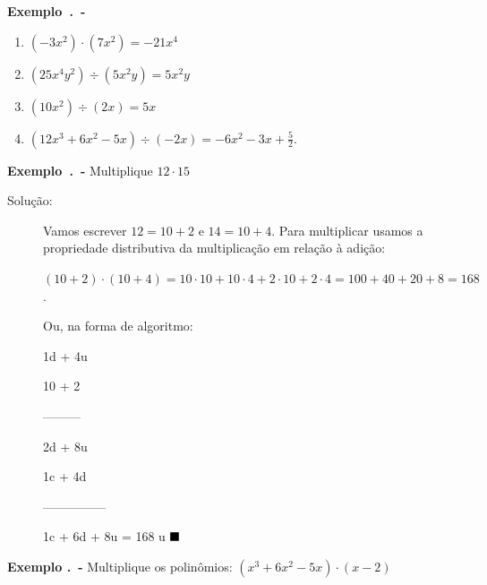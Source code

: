\textbf{Exemplo~\thesubsection.\theexemplo~-}
\settowidth{}
\begin{description}[leftmargin=\dimexpr\widest+\labelsep\relax,labelindent=0pt,
    labelwidth=\widest]
\item[]

\begin{enumerate}[label=(\alph*)]
    \item $(-3x^2 ) \cdot (7x^2) = -21x^4$
    \item $(25x^4 y^2) \div (5x^2 y) = 5x^2y$
    \item $(10x^2) \div (2x) = 5x$
    \item $(12x^3 + 6x^2 - 5x) \div (-2x) = -6x^2 - 3x + \frac{5}{2}$.   

\end{enumerate}
\end{description}

\textbf{Exemplo~\thesubsection.\theexemplo~-} Multiplique $12 \cdot 15$ \label{ex:3.2.3}

\begin{description}
\item[Solução:]
Vamos escrever $12 = 10 + 2$ e $14 = 10 + 4$. Para multiplicar usamos a propriedade distributiva da multiplicação em relação à adição:

$(10 + 2) \cdot  (10 + 4) = 10 \cdot 10 + 10 \cdot 4 + 2 \cdot 10 + 2 \cdot 4 = 100 + 40 + 20 + 8 = 168$.

Ou, na forma de algoritmo:

\hspace{7mm} 1d + 4u

\hspace{7mm} 10 + 2

\hspace{7mm} ---------

\hspace{7mm} 2d    + 8u

\hspace{-1mm} 1c  + 4d

            ---------------

            1c + 6d + 8u        = 168 u $\qedsymbol$


\end{description}

\noindent\textbf{Exemplo \thesubsection.\theexemplo~-} Multiplique os polinômios: $(x^3 + 6x^2 - 5x) \cdot (x - 2)$

